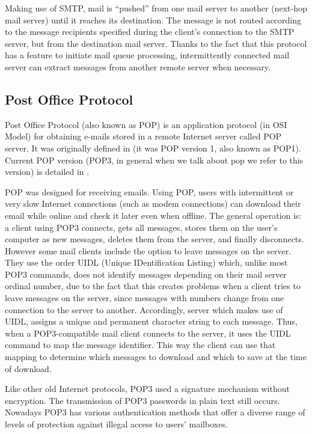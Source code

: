 Making use of SMTP, mail is ``pushed'' from one mail server to another (next-hop mail server) until it reaches its destination. The message is not routed according to the message recipients specified during the client's connection to the SMTP server, but from the destination mail server. Thanks to the fact that this protocol has a feature to initiate mail queue processing, intermittently connected mail server can extract messages from another remote server when necessary.

\subsection{Post Office Protocol} \label{ssect:pop}

Post Office Protocol (also known as POP) is an application protocol (in OSI Model) for obtaining e-mails stored in a remote Internet server called POP server. It was originally defined in \cite{rfc918} (it was POP version 1, also known as POP1). Current POP version (POP3, in general when we talk about pop we refer to this version) is detailed in \cite{rfc1939}.

POP was designed for receiving emails. Using POP, users with intermittent or very slow Internet connections (such as modem connections) can download their email while online and check it later even when offline. The general operation is: a client using POP3 connects, gets all messages, stores them on the user's computer as new messages, deletes them from the server, and finally disconnects. However some mail clients include the option to leave messages on the server. They use the order UIDL (Unique IDentification Listing) which, unlike most POP3 commands, does not identify messages depending on their mail server ordinal number, due to the fact that this creates problems when a client tries to leave messages on the server, since messages with numbers change from one connection to the server to another. Accordingly, server which makes use of UIDL, assigns a unique and permanent character string to each message. Thus, when a POP3-compatible mail client connects to the server, it uses the UIDL command to map the message identifier. This way the client can use that mapping to determine which messages to download and which to save at the time of download.

Like other old Internet protocols, POP3 used a signature mechanism without encryption. The transmission of POP3 passwords in plain text still occurs. Nowadays POP3 has various authentication methods that offer a diverse range of levels of protection against illegal access to users' mailboxes.


